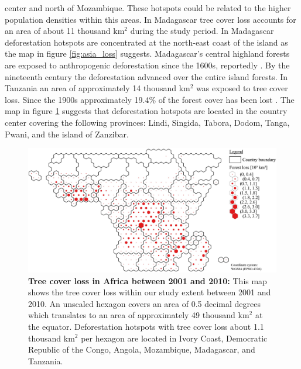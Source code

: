 center and north of Mozambique. These hotspots could be related to the higher population densities within this areas. In Madagascar tree cover loss accounts for an area of about 11 thousand km$^2$ during the study period. In Madagascar deforestation hotspots are concentrated at the north-east coast of the island as the map in figure \ref{fig:asia_loss} suggests. Madagascar's central highland forests are exposed to anthropogenic deforestation since the 1600s, reportedly \citep{Harper2007}. By the nineteenth century the deforestation advanced over the entire island forests. In Tanzania an area of approximately 14 thousand km$^2$ was exposed to tree cover loss. Since the 1900s approximately 19.4\% of the forest cover has been lost \citep{Kideghesho2015}. The map in figure \ref{fig:africa_loss} suggests that deforestation hotspots are located in the country center covering the following provinces: Lindi, Singida, Tabora, Dodom, Tanga, Pwani, and the island of Zanzibar.
			\begin{figure}[ht]
				\centering
				\includegraphics[scale=1.]{img/africa_loss_frameless}
				\caption[Tree cover loss in Africa between 2001 and 2010]{\textbf{Tree cover loss in Africa between 2001 and 2010:} This map shows the tree cover loss within our study extent between 2001 and 2010. An unscaled hexagon covers an area of 0.5 decimal degrees which translates to an area of approximately 49 thousand km$^2$ at the equator. Deforestation hotspots with tree cover loss about 1.1 thousand km$^2$ per hexagon are located in Ivory Coast, Democratic Republic of the Congo, Angola, Mozambique, Madagascar, and Tanzania.}
				\label{fig:africa_loss}
			\end{figure}


